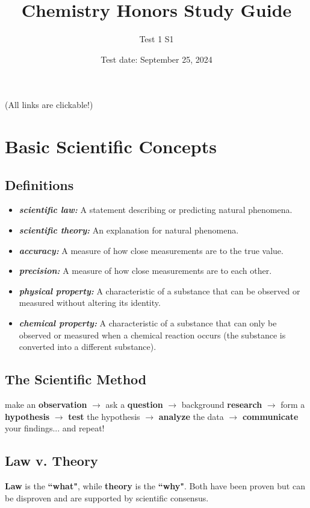 \documentclass[a4paper, 12pt]{article}
\title{Chemistry Honors Study Guide}
\author{Test 1 S1}
\date{Test date: September 25, 2024}
\begin{document}
\maketitle

\begin{center}
    (All links are clickable!)
\end{center}

\section{Basic Scientific Concepts}

\subsection*{Definitions}

\begin{itemize}[leftmargin=*, nosep]
    \item \textbf{\textit{scientific law:}} A statement describing or predicting natural phenomena.
    \item \textbf{\textit{scientific theory:}} An explanation for natural phenomena.
    \item \textbf{\textit{accuracy:}} A measure of how close measurements are to the true value.
    \item \textbf{\textit{precision:}} A measure of how close measurements are to each other.
    \item \textbf{\textit{physical property:}} A characteristic of a substance that can be observed or measured without altering its identity.
    \item \textbf{\textit{chemical property:}} A characteristic of a substance that can only be observed or measured when a chemical reaction occurs (the substance is converted into a different substance). 
\end{itemize}

\subsection*{The Scientific Method}
make an \textbf{observation} $\xrightarrow{}$ ask a \textbf{question} $\xrightarrow{}$ background \textbf{research} $\xrightarrow{}$ form a \textbf{hypothesis} $\xrightarrow{}$ \textbf{test} the hypothesis $\xrightarrow{}$ \textbf{analyze} the data $\xrightarrow{}$ \textbf{communicate} your findings... and repeat!

\subsection*{Law v. Theory}
\textbf{Law} is the \textbf{``what"}, while \textbf{theory} is the \textbf{``why"}. Both have been proven but can be disproven and are supported by scientific consensus.  
 
\end{document}
